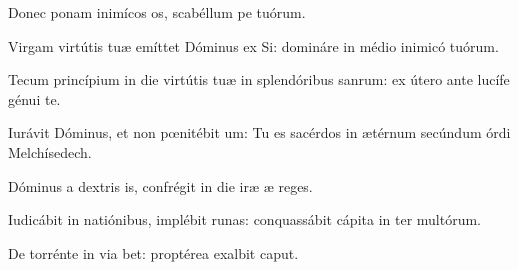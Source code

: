 \item {}

\item Donec ponam inimícos os,\psstar{} scabéllum pe tuórum.

\item Virgam virtútis tuæ emíttet Dóminus ex Si:\psstar{} domináre in médio inimicó tuórum.

\item Tecum princípium in die virtútis tuæ in splendóribus sanrum:\psstar{} ex útero ante lucífe génui te.

\item Iurávit Dóminus, et non pœnitébit um:\psstar{} Tu es sacérdos in ætérnum secúndum órdi Melchísedech.

\item Dóminus a dextris is,\psstar{} confrégit in die iræ æ reges.

\item Iudicábit in natiónibus, implébit runas:\psstar{} conquassábit cápita in ter multórum.

\item De torrénte in via bet:\psstar{} proptérea exalbit caput.
